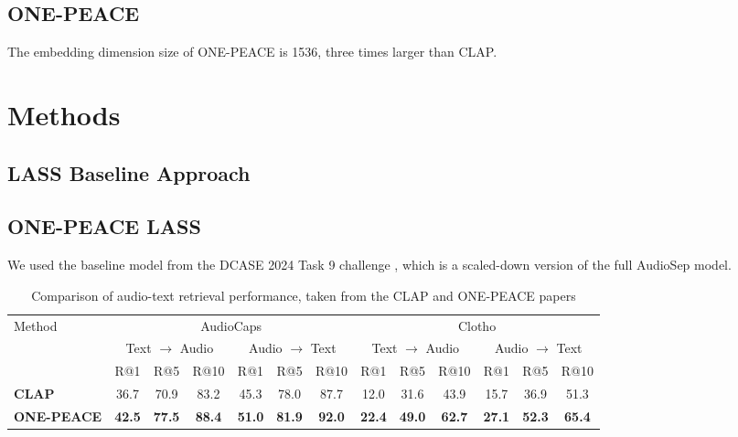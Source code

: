 \documentclass[11pt]{article}
\begin{document}
\subsection{ONE-PEACE}

The embedding dimension size of ONE-PEACE is 1536, three times larger than CLAP.

\section{Methods}
\subsection{LASS Baseline Approach}
\subsection{ONE-PEACE LASS}
We used the baseline model from the DCASE 2024 Task 9 challenge , which is a scaled-down version of the full AudioSep model. 




\begin{table*}[ht]
\centering
\label{tab:audio_text_retrieval}
    \begin{tabular}{lcccccccccccc}
        \toprule
        \multirow{2}{*}{Method} & \multicolumn{6}{c}{AudioCaps} & \multicolumn{6}{c}{Clotho} \\
        \cmidrule(lr){2-7} \cmidrule(lr){8-13}
         & \multicolumn{3}{c}{Text $\to$ Audio} & \multicolumn{3}{c}{Audio $\to$ Text} & \multicolumn{3}{c}{Text $\to$ Audio} & \multicolumn{3}{c}{Audio $\to$ Text} \\
        \cmidrule(lr){2-4} \cmidrule(lr){5-7} \cmidrule(lr){8-10} \cmidrule(lr){11-13}
         & R@1 & R@5 & R@10 & R@1 & R@5 & R@10 & R@1 & R@5 & R@10 & R@1 & R@5 & R@10 \\
        \midrule

        \textbf{CLAP} & 36.7 & 70.9 & 83.2 & 45.3 & 78.0 & 87.7 & 12.0 & 31.6 & 43.9 & 15.7 & 36.9 & 51.3 \\

        
        \textbf{ONE-PEACE} & \textbf{42.5} & \textbf{77.5} & \textbf{88.4} & \textbf{51.0} & \textbf{81.9} & \textbf{92.0} & \textbf{22.4} & \textbf{49.0} & \textbf{62.7} & \textbf{27.1} & \textbf{52.3} & \textbf{65.4} \\
        \bottomrule
    \end{tabular}
    
    \caption{Comparison of audio-text retrieval performance, taken from the CLAP and ONE-PEACE papers}
\end{table*}
\end{document}
